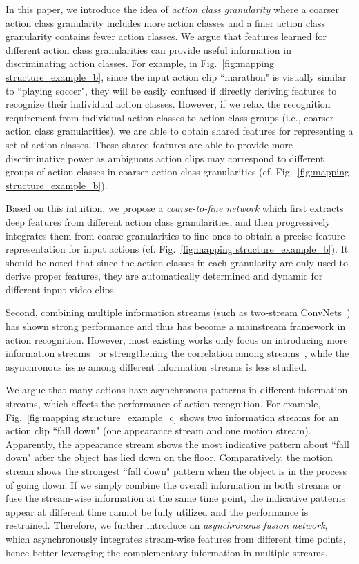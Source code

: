 \documentclass[letterpaper]{article}
\begin{document}
In this paper, we introduce the idea of \emph{action class granularity} where a coarser action class granularity includes more action classes and a finer action class granularity contains fewer action classes. We argue that features learned for different action class  granularities can provide useful information in discriminating action classes. For example, in Fig.~\ref{fig:mapping structure_example_b}, since the input action clip ``marathon" is visually similar to ``playing soccer", they will be easily confused if directly deriving features to recognize their individual action classes. However, if we relax the recognition requirement from individual action classes to action class groups (i.e., coarser action class granularities), we are able to obtain shared features for representing a set of action classes. These shared features are able to provide more discriminative power as ambiguous action clips may correspond to different groups of action classes in coarser action class granularities (cf. Fig.~\ref{fig:mapping structure_example_b}).

Based on this intuition, we propose a \emph{coarse-to-fine network} which first extracts deep features from different action class granularities, and then progressively integrates them from coarse granularities to fine ones to obtain a precise feature representation for input actions (cf. Fig.~\ref{fig:mapping structure_example_b}). It should be noted that since the action classes in each granularity are only used to derive proper features, they are automatically determined and dynamic for different input video clips.



Second, combining multiple information streams (such as two-stream ConvNets~\cite{baseline}) has shown strong performance and thus has become a mainstream framework in action recognition. However, most existing works only focus on introducing more information streams~\cite{3stream,3stream2} or strengthening the correlation among streams~\cite{TSN,wumultifusion,lstmiccv2017}, while the asynchronous issue among different information streams is less studied.

We argue that many actions have asynchronous patterns in different information streams, which affects the performance of action recognition. For example, Fig.~\ref{fig:mapping structure_example_c} shows two information streams for an action clip ``fall down" (one appearance stream and one motion stream). Apparently, the appearance stream shows the most indicative pattern about ``fall down" after the object has lied down on the floor. Comparatively, the motion stream shows the strongest ``fall down" pattern when the object is in the process of going down. If we simply combine the overall information in both streams or fuse the stream-wise information at the same time point, the indicative patterns appear at different time cannot be fully utilized and the performance is restrained. Therefore, we further introduce an \emph{asynchronous fusion network}, which asynchronously integrates stream-wise features from different time points, hence better leveraging the complementary information in multiple streams.
\end{document}
